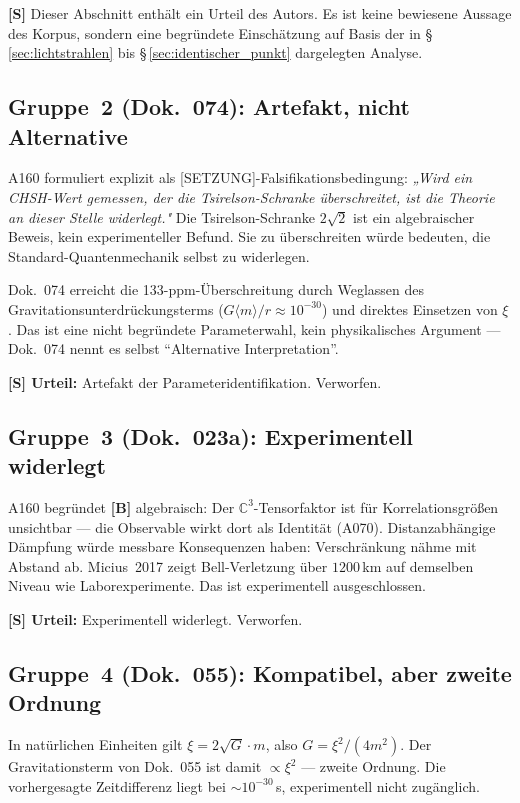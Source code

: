 \textbf{[S]} Dieser Abschnitt enthält ein Urteil des Autors. Es ist keine
bewiesene Aussage des Korpus, sondern eine begründete Einschätzung auf
Basis der in §\,\ref{sec:lichtstrahlen} bis §\,\ref{sec:identischer_punkt}
dargelegten Analyse.

\subsection{Gruppe~2 (Dok.~074): Artefakt, nicht Alternative}

A160 formuliert explizit als [SETZUNG]-Falsifikationsbedingung:
\emph{„Wird ein CHSH-Wert gemessen, der die Tsirelson-Schranke
überschreitet, ist die Theorie an dieser Stelle widerlegt."}
Die Tsirelson-Schranke $2\sqrt{2}$ ist ein algebraischer Beweis,
kein experimenteller Befund. Sie zu überschreiten würde bedeuten,
die Standard-Quantenmechanik selbst zu widerlegen.

Dok.~074 erreicht die 133-ppm-Überschreitung durch Weglassen des
Gravitationsunterdrückungsterms ($G\langle m\rangle/r \approx 10^{-30}$)
und direktes Einsetzen von $\xi$. Das ist eine nicht begründete
Parameterwahl, kein physikalisches Argument --- Dok.~074 nennt es
selbst \enquote{Alternative Interpretation}.

\textbf{[S] Urteil:} Artefakt der Parameteridentifikation. Verworfen.

\subsection{Gruppe~3 (Dok.~023a): Experimentell widerlegt}

A160 begründet \textbf{[B]} algebraisch: Der $\mathbb{C}^3$-Tensorfaktor
ist für Korrelationsgrößen unsichtbar --- die Observable wirkt dort
als Identität (A070). Distanzabhängige Dämpfung würde messbare
Konsequenzen haben: Verschränkung nähme mit Abstand ab.
Micius~2017 zeigt Bell-Verletzung über $1200$\,km auf demselben
Niveau wie Laborexperimente. Das ist experimentell ausgeschlossen.

\textbf{[S] Urteil:} Experimentell widerlegt. Verworfen.

\subsection{Gruppe~4 (Dok.~055): Kompatibel, aber zweite Ordnung}

In natürlichen Einheiten gilt $\xi = 2\sqrt{G}\cdot m$, also
$G = \xi^2/(4m^2)$. Der Gravitationsterm von Dok.~055 ist damit
$\propto \xi^2$ --- zweite Ordnung. Die vorhergesagte Zeitdifferenz
liegt bei $\sim 10^{-30}$\,s, experimentell nicht zugänglich.

